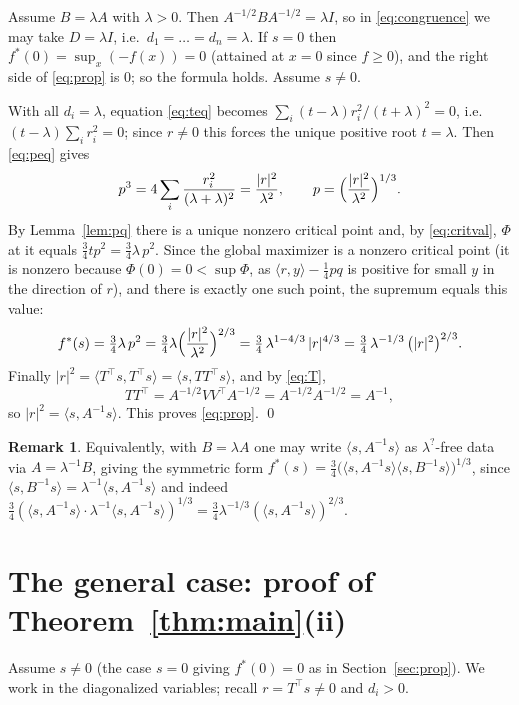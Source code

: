 \documentclass{amsart}
\theoremstyle{definition}
\newtheorem{remark}{Remark}
\begin{document}
Assume $B=\lambda A$ with $\lambda>0$. Then $A^{-1/2}BA^{-1/2}=\lambda I$, so in \eqref{eq:congruence} we may take $D=\lambda I$, i.e.\ $d_1=\dots=d_n=\lambda$. If $s=0$ then $f^*(0)=\sup_x(-f(x))=0$ (attained at $x=0$ since $f\ge0$), and the right side of \eqref{eq:prop} is $0$; so the formula holds. Assume $s\ne0$.

With all $d_i=\lambda$, equation \eqref{eq:teq} becomes $\sum_i (t-\lambda)r_i^2/(t+\lambda)^2=0$, i.e.\ $(t-\lambda)\sum_i r_i^2=0$; since $r\ne0$ this forces the unique positive root $t=\lambda$. Then \eqref{eq:peq} gives
\[
p^3=4\sum_i\frac{r_i^2}{(\lambda+\lambda)^2}=\frac{|r|^2}{\lambda^2},\qquad p=\Bigl(\frac{|r|^2}{\lambda^2}\Bigr)^{1/3}.
\]
By Lemma~\ref{lem:pq} there is a unique nonzero critical point and, by \eqref{eq:critval}, $\Phi$ at it equals $\tfrac34 t p^2=\tfrac34\lambda\,p^2$. Since the global maximizer is a nonzero critical point (it is nonzero because $\Phi(0)=0<\sup\Phi$, as $\langle r,y\rangle-\tfrac14 p q$ is positive for small $y$ in the direction of $r$), and there is exactly one such point, the supremum equals this value:
\[
f^*(s)=\tfrac34\lambda\,p^2=\tfrac34\lambda\Bigl(\frac{|r|^2}{\lambda^2}\Bigr)^{2/3}
=\tfrac34\,\lambda^{1-4/3}\,|r|^{4/3}=\tfrac34\,\lambda^{-1/3}\,\bigl(|r|^2\bigr)^{2/3}.
\]
Finally $|r|^2=\langle T^\top s,T^\top s\rangle=\langle s,TT^\top s\rangle$, and by \eqref{eq:T},
\[
TT^\top=A^{-1/2}VV^\top A^{-1/2}=A^{-1/2}A^{-1/2}=A^{-1},
\]
so $|r|^2=\langle s,A^{-1}s\rangle$. This proves \eqref{eq:prop}. \qed

\begin{remark}
Equivalently, with $B=\lambda A$ one may write $\langle s,A^{-1}s\rangle$ as $\lambda^{?}$-free data via $A=\lambda^{-1}B$, giving the symmetric form $f^*(s)=\tfrac34\bigl(\langle s,A^{-1}s\rangle\langle s,B^{-1}s\rangle\bigr)^{1/3}$, since $\langle s,B^{-1}s\rangle=\lambda^{-1}\langle s,A^{-1}s\rangle$ and indeed $\tfrac34(\langle s,A^{-1}s\rangle\cdot\lambda^{-1}\langle s,A^{-1}s\rangle)^{1/3}=\tfrac34\lambda^{-1/3}(\langle s,A^{-1}s\rangle)^{2/3}$.
\end{remark}

\section{The general case: proof of Theorem~\ref{thm:main}(ii)}\label{sec:general}

Assume $s\ne0$ (the case $s=0$ giving $f^*(0)=0$ as in Section~\ref{sec:prop}). We work in the diagonalized variables; recall $r=T^\top s\ne0$ and $d_i>0$.
\end{document}
